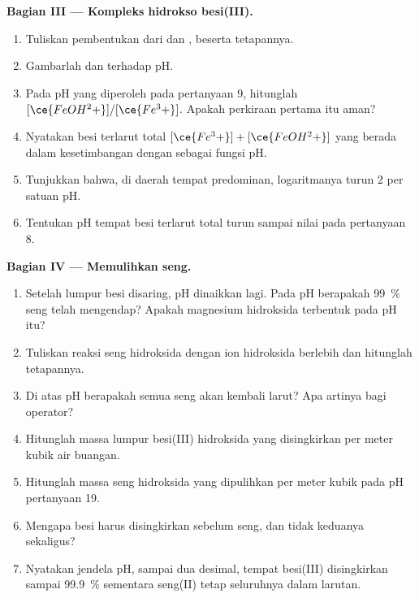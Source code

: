 \begin{problem}
\medskip
\noindent\textbf{Bagian III --- Kompleks hidrokso besi(III).}
\begin{enumerate}[resume]
  \item Tuliskan pembentukan  dari  dan ,
        beserta tetapannya.
  \item Gambarlah   dan 
        terhadap pH.
  \item Pada pH yang diperoleh pada pertanyaan 9, hitunglah
        $[\ce{FeOH^2+}]/[\ce{Fe^3+}]$. Apakah perkiraan pertama itu aman?
  \item Nyatakan besi terlarut total $[\ce{Fe^3+}] + [\ce{FeOH^2+}]$ yang
        berada dalam kesetimbangan dengan  sebagai fungsi pH.
  \item Tunjukkan bahwa, di daerah tempat  predominan,
        logaritmanya turun 2 per satuan pH.
  \item Tentukan pH tempat besi terlarut total turun sampai nilai pada
        pertanyaan 8.
\end{enumerate}

\medskip
\noindent\textbf{Bagian IV --- Memulihkan seng.}
\begin{enumerate}[resume]
  \item Setelah lumpur besi disaring, pH dinaikkan lagi. Pada pH
        berapakah \qty{99}{\percent} seng telah mengendap? Apakah magnesium
        hidroksida terbentuk pada pH itu?
  \item Tuliskan reaksi seng hidroksida dengan ion hidroksida berlebih
        dan hitunglah tetapannya.
  \item Di atas pH berapakah semua seng akan kembali larut? Apa artinya
        bagi operator?
  \item Hitunglah massa lumpur besi(III) hidroksida yang disingkirkan per
        meter kubik air buangan.
  \item Hitunglah massa seng hidroksida yang dipulihkan per meter kubik
        pada pH pertanyaan 19.
  \item Mengapa besi harus disingkirkan sebelum seng, dan tidak
        keduanya sekaligus?
  \item Nyatakan jendela pH, sampai dua desimal, tempat besi(III)
        disingkirkan sampai \qty{99.9}{\percent} sementara seng(II) tetap
        seluruhnya dalam larutan.
\end{enumerate}
\end{problem}
